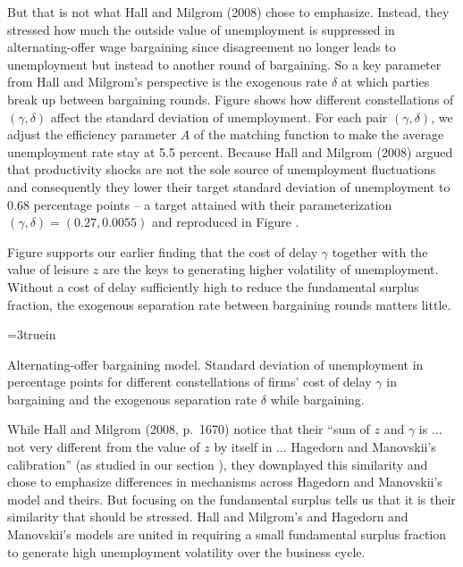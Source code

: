 But that is not what
Hall and Milgrom (2008) chose to emphasize. Instead, they stressed how much the
outside value of unemployment is suppressed in alternating-offer
wage bargaining since disagreement no longer leads to
unemployment but instead to another round of bargaining. So
a key parameter from Hall and Milgrom's perspective
is the exogenous rate $\delta$ at which parties break up
between bargaining rounds. Figure  shows
how different constellations of $(\gamma, \delta)$ affect the
standard deviation of unemployment.  %
For each pair $(\gamma,\delta)$, we adjust the efficiency
parameter $A$ of the matching function to make the average
unemployment rate stay at 5.5 percent. Because
Hall and Milgrom (2008) argued that productivity shocks are not
the sole source of unemployment fluctuations and consequently they lower their target  standard deviation
of unemployment to 0.68 percentage points -- a target
attained with their parameterization
$(\gamma, \delta)=(0.27, 0.0055)$
and reproduced in Figure .

Figure  supports our earlier finding
that the cost of delay $\gamma$ together with the value of
leisure $z$ are the keys to  generating higher volatility
of unemployment. Without a cost of delay sufficiently high
to reduce the fundamental surplus fraction, the exogenous separation rate between
bargaining rounds  matters little.

\centerline{\epsfxsize=3truein}
\caption{Alternating-offer bargaining model. Standard deviation of unemployment in percentage
points for different constellations of firms' cost of delay
$\gamma$ in bargaining  and the exogenous separation rate
$\delta$ while bargaining.}
\endfigure

While Hall and Milgrom (2008, p.~1670) notice that their ``sum
of $z$ and $\gamma$ is $\ldots$ not very different from the value
of $z$ by itself in $\ldots$ Hagedorn and Manovskii's
calibration'' (as studied in our section ),
they downplayed this  similarity and chose to emphasize
  differences in mechanisms across Hagedorn and Manovskii's model and theirs.
But   focusing on the  fundamental surplus tells us that it is
their similarity that should
be stressed.   Hall and Milgrom's and Hagedorn and Manovskii's  models are united in requiring a small fundamental
surplus fraction  to generate high unemployment volatility
over the business cycle.


